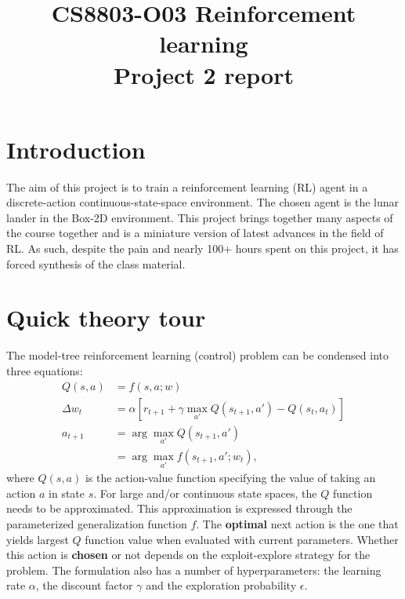 \documentclass[conference]{IEEEtran}
\begin{document}
\title{CS8803-O03 Reinforcement learning\\Project 2 report}

\author{
}
\maketitle


\IEEEpeerreviewmaketitle
\section{Introduction}
The aim of this project is to train a reinforcement learning (RL) agent in a discrete-action continuous-state-space environment. The chosen agent is the lunar lander in the Box-2D environment. This project brings together many aspects of the course together and is a miniature version of latest advances in the field of RL. As such, despite the pain and nearly 100+ hours spent on this project, it has forced synthesis of the class material.
\section{Quick theory tour}
The model-tree reinforcement learning (control) problem can be condensed into three equations:
\begin{align}
Q(s, a) &=f(s, a; w) \label{eq:fa} \\
\Delta w_t &= \alpha\left[r_{t+1} + \gamma \max_{a'}Q(s_{t+1}, a') - Q(s_t, a_t)\right] \label{eq:update} \\
a_{t+1} &= \arg\max_{a'} Q(s_{t+1}, a') \nonumber \\
& = \arg\max_{a'} f(s_{t+1}, a'; w_t)\label{eq:action},
\end{align}
where $Q(s, a)$ is the action-value function specifying the value of taking an action $a$ in state $s$. For large and/or continuous state spaces, the $Q$ function needs to be approximated. This approximation is expressed through the parameterized generalization function $f$. The {\bf optimal} next action is the one that yields largest $Q$ function value when evaluated with current parameters. Whether this action is {\bf chosen} or not depends on the exploit-explore strategy for the problem. The formulation also has a number of hyperparameters: the learning rate $\alpha$, the discount factor $\gamma$ and the exploration probability $\epsilon$. 
\end{document}
